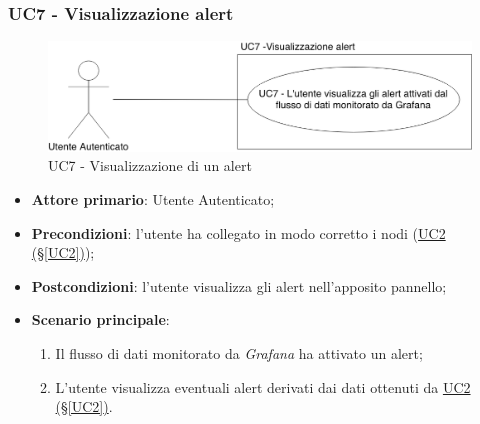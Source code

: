 \pagebreak

\subsubsection{UC7 - Visualizzazione alert}\label{UC7}

\begin{figure}[H]
	\centering
	\includegraphics[scale=0.4]{./images/UC7.png}
	\caption{UC7 - Visualizzazione di un alert}
\end{figure}

\begin{itemize}
	\item \textbf{Attore primario}: Utente Autenticato;
	\item \textbf{Precondizioni}: l'utente ha collegato in modo corretto i nodi 
	(\hyperref[UC2]{UC2 (§\ref*{UC2})});
	\item \textbf{Postcondizioni}: l'utente visualizza gli alert nell'apposito pannello;
	\item \textbf{Scenario principale}:
	\begin{enumerate}
		\item Il flusso di dati monitorato da \textit{Grafana} ha attivato un alert;
		\item L'utente visualizza eventuali alert derivati dai dati ottenuti da  \hyperref[UC2]{UC2 (§\ref*{UC2})}.
	\end{enumerate}
\end{itemize}

\pagebreak

